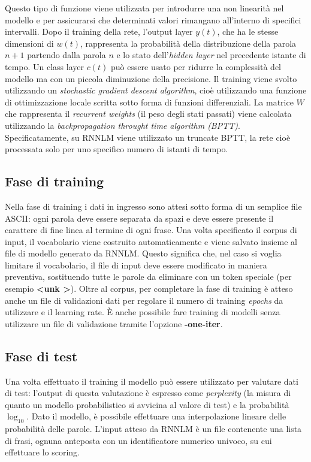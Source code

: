 \documentclass[a4paper,12pt,openright,twoside]{report}
\theoremstyle{definition}
\begin{document}
Questo tipo di funzione viene utilizzata per introdurre una non linearità nel modello e per
assicurarsi che determinati  valori rimangano all'interno di specifici intervalli.
Dopo il training della rete, l'output layer $y(t)$, che ha le stesse dimensioni di $w(t)$,
rappresenta la probabilità della distribuzione della parola $n+1$ partendo dalla parola $n$ 
e lo stato dell'\emph{hidden layer} nel precedente istante di tempo.
Un class layer $c(t)$ può essere usato per ridurre la complessità del modello ma con un piccola
diminuzione della precisione.
Il training viene svolto utilizzando un \emph{stochastic gradient descent algorithm}, cioè utilizzando
una funzione di ottimizzazione locale scritta sotto forma di funzioni differenziali. La matrice $W$
che rappresenta il \emph{recurrent weights} (il peso degli stati passati) viene calcolata utilizzando la 
\emph{backpropagation throught time algorithm (BPTT)}.
Specificatamente, su RNNLM viene utilizzato un truncate BPTT, la rete cioè processata solo per uno specifico
numero di istanti di tempo.

\subsection{Fase di training}
Nella fase di training i dati in ingresso sono attesi sotto forma di un semplice file ASCII: ogni parola
deve essere separata da spazi e deve essere presente il carattere di
fine linea al termine di ogni frase.
Una volta specificato il corpus di input, il vocabolario viene costruito automaticamente e viene salvato insieme 
al file di modello generato da RNNLM.
Questo significa che, nel caso si voglia limitare il vocabolario, il file di input deve essere modificato in maniera
preventiva, sostituendo
tutte le parole da eliminare con un token speciale (per esempio \textbf{\textless unk \textgreater}).
Oltre al corpus, per completare la fase di training è atteso anche un
file di validazioni dati per regolare il numero di training \emph{epochs} da utilizzare e  il learning rate.
\`E anche possibile fare training di modelli senza utilizzare un file di validazione tramite l'opzione \textbf{-one-iter}.
\subsection{Fase di test}
Una volta effettuato il training il modello può essere utilizzato per valutare dati di test:
l'output di questa valutazione è espresso come \emph{perplexity} (la misura di quanto un modello probabilistico
si avvicina al valore di test) e la 
probabilità $\log_{10}$.
Dato il modello, è possibile effettuare una interpolazione lineare delle probabilità delle parole. L'input atteso
da RNNLM è un file contenente una lista di frasi, ognuna anteposta con un identificatore
numerico univoco, su cui effettuare lo scoring.
\end{document}

